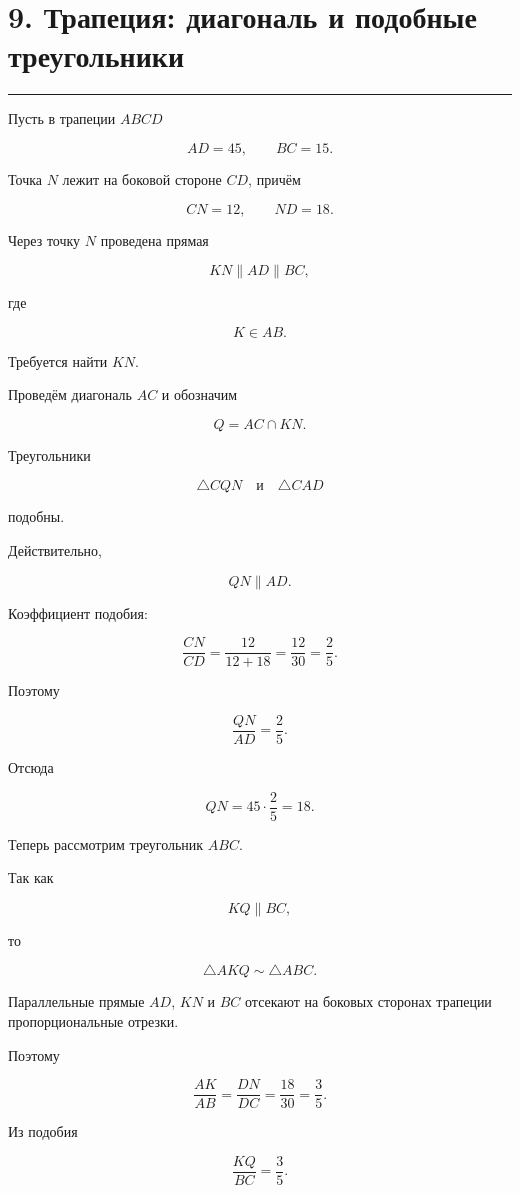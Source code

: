 \documentclass[a4paper,12pt]{article}
\newcommand{\topicline}{
    \textcolor{accent}{\rule{\linewidth}{0.6pt}}
}
\begin{document}

\section*{9. Трапеция: диагональ и подобные треугольники}
\topicline

Пусть в трапеции $ABCD$

\[
AD=45,
\qquad
BC=15.
\]

Точка $N$ лежит на боковой стороне $CD$,
причём

\[
CN=12,
\qquad
ND=18.
\]

Через точку $N$ проведена прямая

\[
KN\parallel AD\parallel BC,
\]

где

\[
K\in AB.
\]

Требуется найти $KN$.

Проведём диагональ $AC$ и обозначим

\[
Q=AC\cap KN.
\]

Треугольники

\[
\triangle CQN
\quad\text{и}\quad
\triangle CAD
\]

подобны.

Действительно,

\[
QN\parallel AD.
\]

Коэффициент подобия:

\[
\frac{CN}{CD}
=
\frac{12}{12+18}
=
\frac{12}{30}
=
\frac25.
\]

Поэтому

\[
\frac{QN}{AD}
=
\frac25.
\]

Отсюда

\[
QN=
45\cdot\frac25
=
18.
\]

Теперь рассмотрим треугольник $ABC$.

Так как

\[
KQ\parallel BC,
\]

то

\[
\triangle AKQ
\sim
\triangle ABC.
\]

Параллельные прямые
$AD$, $KN$ и $BC$
отсекают на боковых сторонах трапеции
пропорциональные отрезки.

Поэтому

\[
\frac{AK}{AB}
=
\frac{DN}{DC}
=
\frac{18}{30}
=
\frac35.
\]

Из подобия

\[
\frac{KQ}{BC}
=
\frac35.
\]
\end{document}
